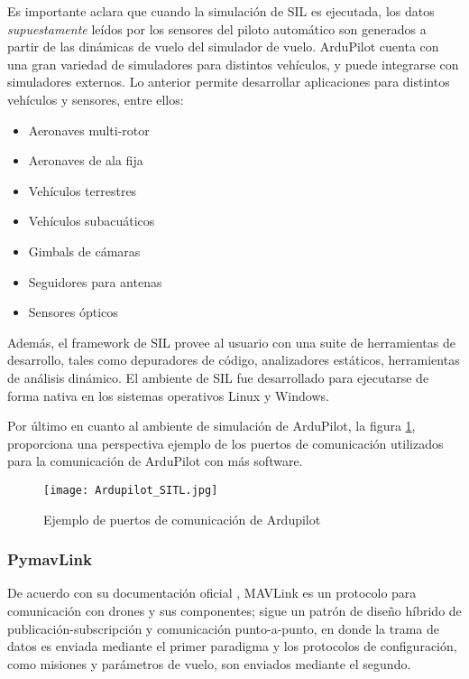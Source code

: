 Es importante aclara que cuando la simulación de SIL es ejecutada, los datos \textit{supuestamente} leídos por los sensores del piloto automático son generados a partir de las dinámicas de vuelo del simulador de vuelo. ArduPilot cuenta con una gran variedad de simuladores para distintos vehículos, y puede integrarse con simuladores externos. Lo anterior permite desarrollar aplicaciones para distintos vehículos y sensores, entre ellos: 

\begin{itemize}
    \item Aeronaves multi-rotor
    \item Aeronaves de ala fija
    \item Vehículos terrestres
    \item Vehículos subacuáticos
    \item Gimbals de cámaras
    \item Seguidores para antenas
    \item Sensores ópticos
\end{itemize}

Además, el framework de SIL provee al usuario con una suite de herramientas de desarrollo, tales como depuradores de código, analizadores estáticos, herramientas de análisis dinámico. El ambiente de SIL fue desarrollado para ejecutarse de forma nativa en los sistemas operativos Linux y Windows.

Por último en cuanto al ambiente de simulación de ArduPilot, la figura \ref{Ardupilot_SIL}, proporciona una perspectiva ejemplo de los puertos de comunicación utilizados para la comunicación de ArduPilot con más software.

\begin{figure}[ht]
    \centering
    \texttt{[image: Ardupilot\_SITL.jpg]}
    \caption{Ejemplo de puertos de comunicación de Ardupilot}
    \label{Ardupilot_SIL}
\end{figure}

\subsubsection{PymavLink}

De acuerdo con su documentación oficial \cite{MAVLink}, MAVLink es un protocolo para comunicación con drones y sus componentes; sigue un patrón de diseño híbrido de publicación-subscripción y comunicación punto-a-punto, en donde la trama de datos es enviada mediante el primer paradigma y los protocolos de configuración, como misiones y parámetros de vuelo, son enviados mediante el segundo.

